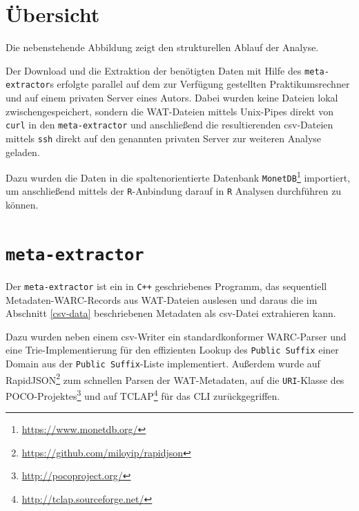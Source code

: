 \documentclass[a4paper,12pt,titlepage=false]{scrreprt}
\begin{document}
\section{Übersicht}

\begin{figure}
\label{wrap-fig:1}
\end{figure}

Die nebenstehende Abbildung zeigt den strukturellen Ablauf der Analyse.

Der Download und die Extraktion der benötigten Daten mit Hilfe des
\texttt{meta-extractor}s erfolgte parallel auf dem zur Verfügung gestellten
Praktikumsrechner und auf einem privaten Server eines Autors. Dabei wurden keine
Dateien lokal zwischengespeichert, sondern die WAT-Dateien mittels Unix-Pipes
direkt von \texttt{curl} in den \texttt{meta-extractor} und anschließend die
resultierenden csv-Dateien mittels \texttt{ssh} direkt auf den genannten
privaten Server zur weiteren Analyse geladen.

Dazu wurden die Daten in die spaltenorientierte Datenbank
\texttt{MonetDB}\footnote{\url{https://www.monetdb.org/}} importiert, um
anschließend mittels der \texttt{R}-Anbindung darauf in \texttt{R} Analysen
durchführen zu können.

\section{\texttt{meta-extractor}}

Der \texttt{meta-extractor} ist ein in \texttt{C++} geschriebenes Programm,
das sequentiell Metadaten-WARC-Records aus WAT-Dateien auslesen und daraus
die im Abschnitt \ref{csv-data} beschriebenen Metadaten als csv-Datei extrahieren
kann.

Dazu wurden neben einem csv-Writer ein standardkonformer WARC-Parser und eine
Trie-Implementierung für den effizienten Lookup des \texttt{Public Suffix} einer
Domain aus der \texttt{Public Suffix}-Liste implementiert.
Außerdem wurde auf RapidJSON\footnote{\url{https://github.com/miloyip/rapidjson}}
zum schnellen Parsen der WAT-Metadaten, auf die \texttt{URI}-Klasse des
POCO-Projektes\footnote{\url{http://pocoproject.org/}} und auf
TCLAP\footnote{\url{http://tclap.sourceforge.net/}} für das CLI zurückgegriffen.
\end{document}
